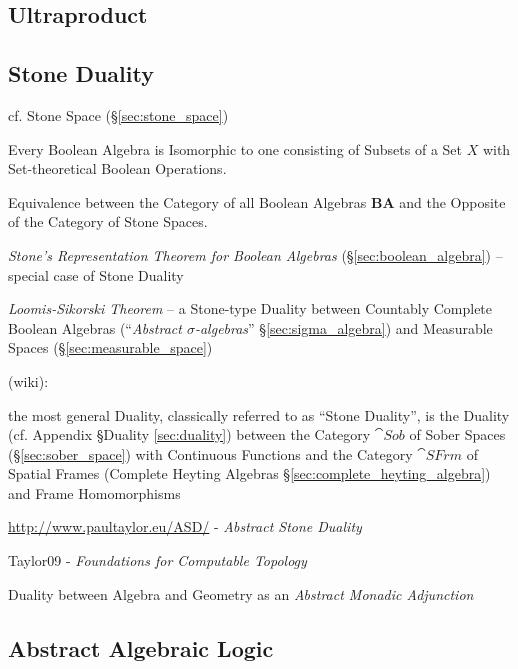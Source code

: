 \subsection{Ultraproduct}\label{sec:ultraproducts}

\subsection{Stone Duality}\label{sec:stone_duality}

\fist cf. Stone Space (\S\ref{sec:stone_space})

Every Boolean Algebra is Isomorphic to one consisting of Subsets of a
Set $X$ with Set-theoretical Boolean Operations.

Equivalence between the Category of all Boolean Algebras $\mathbf{BA}$
and the Opposite of the Category of Stone Spaces.

\fist \emph{Stone's Representation Theorem for Boolean Algebras}
(\S\ref{sec:boolean_algebra}) -- special case of Stone Duality

\emph{Loomis-Sikorski Theorem} -- a Stone-type Duality between Countably
Complete Boolean Algebras (``\emph{Abstract $\sigma$-algebras}''
\S\ref{sec:sigma_algebra}) and Measurable Spaces (\S\ref{sec:measurable_space})

(wiki):

the most general Duality, classically referred to as ``Stone Duality'', is the
Duality (cf. Appendix \S Duality \ref{sec:duality}) between the Category
$\cat{Sob}$ of Sober Spaces (\S\ref{sec:sober_space}) with Continuous Functions
and the Category $\cat{SFrm}$ of Spatial Frames (Complete Heyting Algebras
\S\ref{sec:complete_heyting_algebra}) and Frame Homomorphisms

\url{http://www.paultaylor.eu/ASD/} - \emph{Abstract Stone Duality}

Taylor09 - \emph{Foundations for Computable Topology}

Duality between Algebra and Geometry as an \emph{Abstract Monadic Adjunction}



\subsection{Abstract Algebraic Logic}\label{sec:abstract_algebraic_logic}


